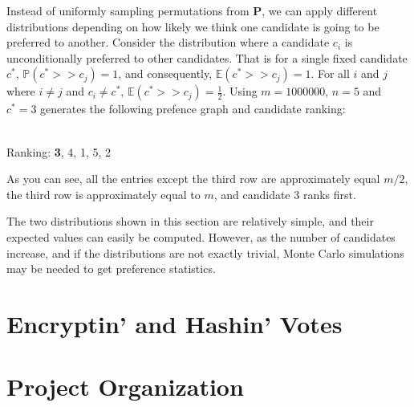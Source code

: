 \documentclass[final,5p,times,twocolumn,authoryear, 10pt]{elsarticle}
\begin{document}
Instead of uniformly sampling permutations from $\mathbf{P}$, we can apply
different distributions depending on how likely we think one candidate is going
to be preferred to another. Consider the distribution where a candidate $c_i$
is unconditionally preferred to other candidates. That is for a single fixed
candidate $c^*$, $\mathds{P}(c^* >> c_j) = 1$, and consequently,
$\mathbb{E}(c^* >> c_j) = 1$. For all $i$ and $j$ where $i \neq j$ and $c_i
\neq c^*$, $\mathbb{E}(c^* >> c_j) = \frac{1}{2}$. Using $m=1000000$, $n=5$ and
$c^* = 3$ generates the following prefence graph and candidate ranking:
\begin{center}
 \\ 
\vspace*{.2cm}
Ranking: \textbf{3}, 4, 1, 5, 2
\end{center}
As you can see, all the entries except the third row are approximately equal
$m/2$, the third row is approximately equal to $m$, and candidate 3 ranks
first.

The two distributions shown in this section are relatively simple, and their
expected values can easily be computed. However, as the number of candidates
increase, and if the distributions are not exactly trivial, Monte Carlo
simulations may be needed to get preference statistics.




\section{Encryptin' and Hashin' Votes}
\label{Encrypting and Hashing Votes}


\section{Project Organization}
\label{Project Organization}
\end{document}
